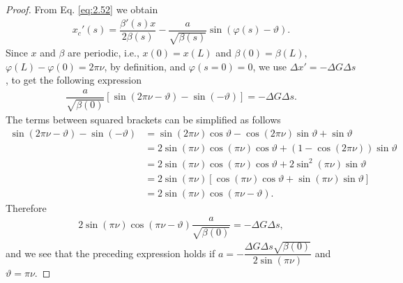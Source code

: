 \begin{proof}
From Eq. \eqref{eq:2.52} we obtain
\begin{align*}
x_c'(s) =\dfrac{\beta'(s)x}{2\beta(s)} - \dfrac{a}{\sqrt{\beta(s)}}\sin\left(\varphi(s) - \vartheta\right).
\end{align*}
Since $x$ and $\beta$ are periodic, i.e., $x(0)=x(L)$ and $\beta(0) = \beta(L)$, $\varphi(L) - \varphi(0) = 2 \pi \nu$, by definition, and $\varphi(s=0)=0$, we use $\Delta x' = -\Delta G \Delta s$,
to get the following expression
\begin{align*}
\dfrac{a}{\sqrt{\beta(0)}}\left[\sin(2\pi \nu - \vartheta) - \sin(-\vartheta)\right] = -\Delta G \Delta s.
\end{align*}
The terms between squared brackets can be simplified as follows
\begin{align*}
\sin(2\pi \nu - \vartheta) - \sin(-\vartheta) &= \sin(2\pi \nu)\cos\vartheta - \cos(2\pi \nu)\sin \vartheta + \sin \vartheta\\
                                         &= 2\sin(\pi \nu)\cos(\pi \nu)\cos\vartheta + \left(1-\cos(2\pi \nu)\right)\sin\vartheta\\
                                           &= 2\sin(\pi \nu)\cos(\pi \nu)\cos\vartheta + 2\sin^2(\pi \nu)\sin\vartheta\\
                                           &= 2\sin(\pi\nu)\left[\cos(\pi\nu)\cos\vartheta + \sin(\pi\nu)\sin\vartheta\right] \\
                                           &=  2\sin(\pi\nu)\cos(\pi\nu - \vartheta).
\end{align*}
Therefore
\begin{align*}
2\sin(\pi\nu)\cos(\pi\nu - \vartheta)\dfrac{a}{\sqrt{\beta(0)}} = -\Delta G \Delta s,
\end{align*}
and we see that the preceding expression holds if $a = -\dfrac{\Delta G \Delta s \sqrt{\beta(0)}}{2 \sin{(\pi\nu)}}$ and $\vartheta = \pi \nu$.
\end{proof}

